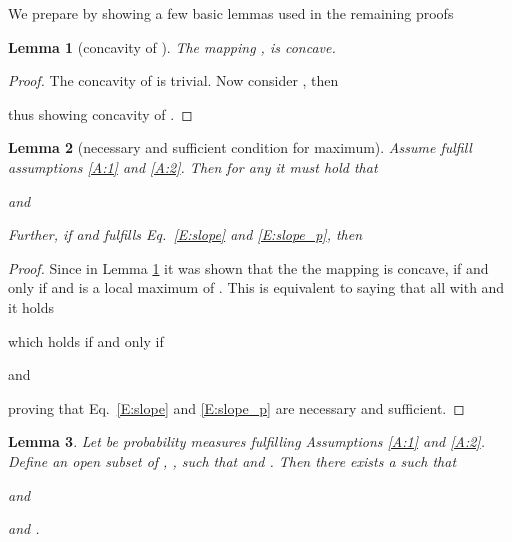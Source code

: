 \documentclass{article}
\newtheorem{lemma}{Lemma}
\begin{document}
We prepare by showing a few basic lemmas used in the remaining proofs

\begin{lemma}[concavity of ]\label{L:pen_concave}
 The mapping ,  is concave.
 \end{lemma}

 \begin{proof}
  The concavity of  is trivial. Now consider , then
  
  thus showing concavity of .
 \end{proof}


\begin{lemma}[necessary and sufficient condition for maximum]\label{L:necessary_for_maximum}
  Assume  fulfill assumptions \ref{A:1} and \ref{A:2}. Then for any  it must hold that
  
  and
  
  Further, if  and fulfills Eq.\ \ref{E:slope} and \ref{E:slope_p}, then 
 \end{lemma}

 \begin{proof}
  Since in Lemma \ref{L:pen_concave} it was shown that the the mapping  is concave,
   if and only if   and  is a local maximum of .
  This is equivalent to saying that all  with  and  it holds
  
  which holds if and only if
  
  and
  
  proving that Eq.\ \ref{E:slope} and \ref{E:slope_p} are necessary and sufficient.
 \end{proof}

 \begin{lemma}\label{L:existence}
  Let  be probability measures fulfilling Assumptions \ref{A:1} and \ref{A:2}.
  Define an open subset of , , such that  and .
  Then there exists a  such that
  
  and
  
  and .
 \end{lemma}
\end{document}
